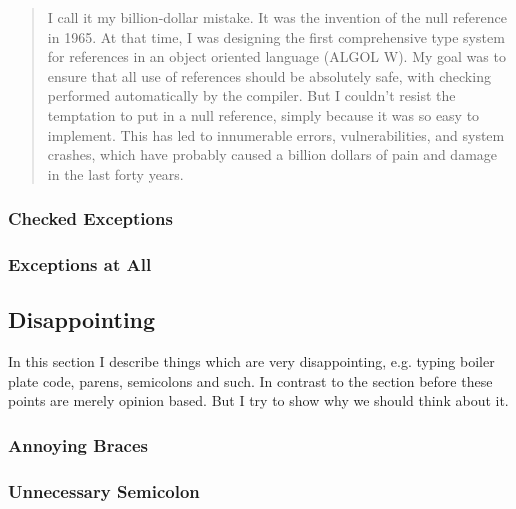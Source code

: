 \documentclass[a4paper,12pt]{article}
\begin{document}
\begin{quotation}
I call it my billion-dollar mistake. It was the invention of the null reference in 1965. At that time, I was designing the first comprehensive type system for references in an object oriented language (ALGOL W). My goal was to ensure that all use of references should be absolutely safe, with checking performed automatically by the compiler. But I couldn't resist the temptation to put in a null reference, simply because it was so easy to implement. This has led to innumerable errors, vulnerabilities, and system crashes, which have probably caused a billion dollars of pain and damage in the last forty years.	
\end{quotation} 


\subsubsection{Checked Exceptions}


\subsubsection{Exceptions at All}


\subsection{Disappointing}

In this section I describe things which are very disappointing, e.g. typing boiler plate code, parens, semicolons and such. In contrast to the section before these points are merely opinion based. But I try to show why we should think about it.

\subsubsection{Annoying Braces}


\subsubsection{Unnecessary Semicolon}
\end{document}
